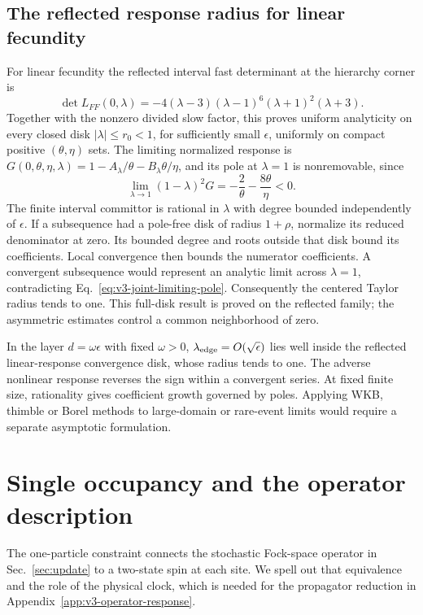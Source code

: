 \documentclass[aps,pre,reprint,amsmath,amssymb,longbibliography]{revtex4-2}
\begin{document}
\subsection{The reflected response radius for linear fecundity}
\label{par:v3-joint-radius-window}
For linear fecundity the reflected interval fast determinant at the
hierarchy corner is
\begin{equation}
 \det L_{FF}(0,\lambda)
 =-4(\lambda-3)(\lambda-1)^6(\lambda+1)^2(\lambda+3).
 \label{eq:v3-joint-fast-determinant}
\end{equation}
Together with the nonzero divided slow factor, this proves uniform
analyticity on every closed disk $|\lambda|\le r_0<1$, for sufficiently
small $\epsilon$, uniformly on compact positive $(\theta,\eta)$ sets.
The limiting normalized response is
$G(0,\theta,\eta,\lambda)=1-A_\lambda/\theta-B_\lambda\theta/\eta$,
and its pole at $\lambda=1$ is nonremovable, since 
\begin{equation}
 \lim_{\lambda\to1}(1-\lambda)^2G
 =-\frac2\theta-\frac{8\theta}\eta<0.
 \label{eq:v3-joint-limiting-pole}
\end{equation}
The finite interval committor is rational in $\lambda$ with degree
bounded independently of $\epsilon$. If a subsequence had a pole-free
disk of radius $1+\rho$, normalize its reduced denominator at zero.
Its bounded degree and roots outside that disk bound its coefficients.
Local convergence then bounds the numerator coefficients. A convergent
subsequence would represent an analytic limit across $\lambda=1$,
contradicting Eq.~\eqref{eq:v3-joint-limiting-pole}. Consequently the
centered Taylor radius tends to one. This full-disk result is proved
on the reflected family; the asymmetric estimates control a common
neighborhood of zero.

In the layer $d=\omega\epsilon$ with fixed $\omega>0$, $\lambda_{\rm edge}=O(\sqrt\epsilon)$ lies well inside the
reflected linear-response convergence disk, whose radius tends to one.
The adverse nonlinear response reverses the sign within a convergent
series. At fixed finite size, rationality gives coefficient growth
governed by poles. Applying WKB, thimble or Borel methods to large-domain
or rare-event limits would require a separate asymptotic formulation.

\section{Single occupancy and the operator description}
\label{sec:physics}
The one-particle constraint connects the stochastic Fock-space
operator in Sec.~\ref{sec:update} to a two-state spin at each site.
We spell out that equivalence and the role of the physical clock,
which is needed for the propagator reduction in
Appendix~\ref{app:v3-operator-response}.
\end{document}
